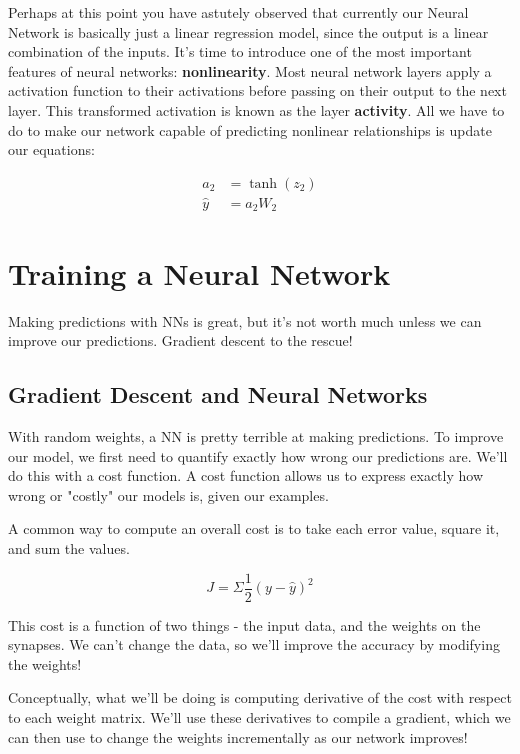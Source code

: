\documentclass[]{article}
\begin{document}
Perhaps at this point you have astutely observed that currently our Neural Network is basically just a linear regression model, since the output is a linear combination of the inputs. It's time to introduce one of the most important features of neural networks: \textbf{nonlinearity}. Most neural network layers apply a activation function to their activations before passing on their output to the next layer. This transformed activation is known as the layer \textbf{activity}. All we have to do to make our network capable of predicting nonlinear relationships is update our equations:

\begin{align}
	a_2 &= \tanh (z_2) \\
	\hat{y} &= a_2 W_2
\end{align}

\section{Training a Neural Network}

Making predictions with NNs is great, but it's not worth much unless we can improve our predictions. Gradient descent to the rescue!

\subsection{Gradient Descent and Neural Networks}
With random weights, a NN is pretty terrible at making predictions. To improve our model, we first need to quantify exactly how wrong our predictions are. We'll do this with a cost function. A cost function allows us to express exactly how wrong or "costly" our models is, given our examples.

A common way to compute an overall cost is to take each error value, square it, and sum the values. 

\begin{equation}
	J = \Sigma \frac{1}{2}(y- \hat{y})^{2}
\end{equation}

This cost is a function of two things - the input data, and the weights on the synapses. We can't change the data, so we'll improve the accuracy by modifying the weights!

Conceptually, what we'll be doing is computing derivative of the cost with respect to each weight matrix. We'll use these derivatives to compile a gradient, which we can then use to change the weights incrementally as our network improves!
\end{document}
